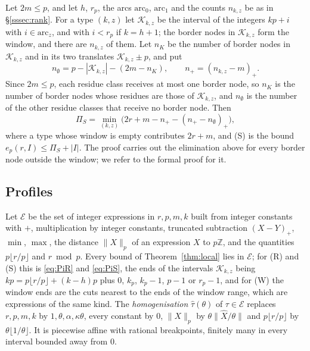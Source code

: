 \documentclass[11pt]{amsart}
\theoremstyle{definition}
\theoremstyle{remark}
\numberwithin{equation}{section}
\newcommand{\Z}{\mathbb Z}
\begin{document}
Let $2m\le p$, and let $h$, $r_p$, the arcs $\mathrm{arc}_0$, $\mathrm{arc}_1$ and the counts $n_{k,z}$ be as in
\S\ref{sssec:rank}. For a type $(k,z)$ let $\mathcal K_{k,z}$ be the interval of the integers $kp+i$ with $i\in\mathrm{arc}_z$, and with
$i<r_p$ if $k=h+1$; the border nodes in $\mathcal K_{k,z}$ form the window, and there are $n_{k,z}$ of them. Let $n_K$ be the number
of border nodes in $\mathcal K_{k,z}$ and in its two translates $\mathcal K_{k,z}\pm p$, and put
\[
 n_\emptyset=p-|\mathcal K_{k,z}|-(2m-n_K),\qquad n_+=(n_{k,z}-m)_+ .
\]
Since $2m\le p$, each residue class receives at most one border node, so $n_K$ is the number of border nodes whose residues
are those of $\mathcal K_{k,z}$, and $n_\emptyset$ is the number of the other residue classes that receive no border node. Then
\begin{equation}\label{eq:PiS}
 \Pi_S=\min_{(k,z)}\bigl(2r+m-n_+-(n_+-n_\emptyset)_+\bigr),
\end{equation}
where a type whose window is empty contributes $2r+m$, and (S) is the bound $e_p(r,I)\le\Pi_S+|I|$. The proof carries out
the elimination above for every border node outside the window; we refer to the formal proof for it.

\subsection{Profiles}\label{ssec:profiles}
Let $\mathcal E$ be the set of integer expressions in $r,p,m,k$ built from integer constants with $+$, multiplication by
integer constants, truncated subtraction $(X-Y)_+$, $\min$, $\max$, the distance $\|X\|_p$ of an expression $X$ to $p\Z$,
and the quantities $p\lfloor r/p\rfloor$ and $r\bmod p$. Every bound of Theorem~\ref{thm:local} lies in $\mathcal E$; for (R)
and (S) this is \eqref{eq:PiR} and \eqref{eq:PiS}, the ends of the intervals $\mathcal K_{k,z}$ being $kp=p\lfloor r/p\rfloor+(k-h)p$
plus $0$, $k_p$, $k_p-1$, $p-1$ or $r_p-1$, and for (W) the window ends are the cuts nearest to the ends of the window
range, which are expressions of the same kind. The \emph{homogenisation} $\hat\tau(\theta)$ of $\tau\in\mathcal E$ replaces $r,p,m,k$ by
$1,\theta,\alpha,\kappa\theta$, every constant by $0$, $\|X\|_p$ by $\theta\|\hat X/\theta\|$ and $p\lfloor r/p\rfloor$ by
$\theta\lfloor1/\theta\rfloor$. It is piecewise affine with rational breakpoints, finitely many in every interval bounded
away from $0$.
\end{document}
